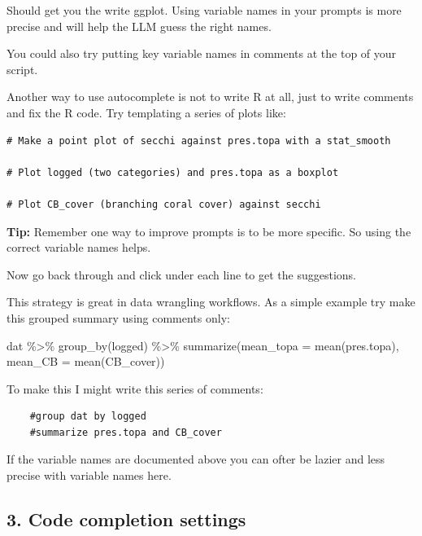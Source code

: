 \documentclass[
  letterpaper,
  DIV=11,
  numbers=noendperiod]{scrreprt}
\newenvironment{Shaded}{\begin{snugshade}}{\end{snugshade}}
\newcommand{\AttributeTok}[1]{\textcolor[rgb]{0.40,0.45,0.13}{#1}}
\newcommand{\FunctionTok}[1]{\textcolor[rgb]{0.28,0.35,0.67}{#1}}
\newcommand{\NormalTok}[1]{\textcolor[rgb]{0.00,0.23,0.31}{#1}}
\newcommand{\SpecialCharTok}[1]{\textcolor[rgb]{0.37,0.37,0.37}{#1}}
\begin{document}
Should get you the write ggplot. Using variable names in your prompts is
more precise and will help the LLM guess the right names.

You could also try putting key variable names in comments at the top of
your script.

Another way to use autocomplete is not to write R at all, just to write
comments and fix the R code. Try templating a series of plots like:

\begin{verbatim}
# Make a point plot of secchi against pres.topa with a stat_smooth

# Plot logged (two categories) and pres.topa as a boxplot

# Plot CB_cover (branching coral cover) against secchi
\end{verbatim}

\textbf{Tip:} Remember one way to improve prompts is to be more
specific. So using the correct variable names helps.

Now go back through and click under each line to get the suggestions.

This strategy is great in data wrangling workflows. As a simple example
try make this grouped summary using comments only:

\begin{Shaded}
\begin{Highlighting}[]
\NormalTok{dat }\SpecialCharTok{\%\textgreater{}\%}
    \FunctionTok{group\_by}\NormalTok{(logged) }\SpecialCharTok{\%\textgreater{}\%}
    \FunctionTok{summarize}\NormalTok{(}\AttributeTok{mean\_topa =} \FunctionTok{mean}\NormalTok{(pres.topa), }
                \AttributeTok{mean\_CB =} \FunctionTok{mean}\NormalTok{(CB\_cover))}
\end{Highlighting}
\end{Shaded}

To make this I might write this series of comments:

\begin{verbatim}
    #group dat by logged 
    #summarize pres.topa and CB_cover
\end{verbatim}

If the variable names are documented above you can ofter be lazier and
less precise with variable names here.

\subsection{3. Code completion settings}\label{code-completion-settings}
\end{document}
